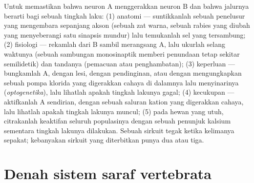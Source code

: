 \begin{method}\label{met:b3:nervous-systems:tracing}
Untuk memastikan bahwa neuron A menggerakkan neuron B dan bahwa jalurnya
berarti bagi sebuah tingkah laku: (1) anatomi --- suntikkanlah sebuah penelusur
yang mengembara sepanjang akson (sebuah zat warna, sebuah  rabies yang
diubah yang menyeberangi satu sinapsis mundur) lalu temukanlah sel yang
tersambung; (2) fisiologi --- rekamlah dari B sambil merangsang A, lalu ukurlah
selang waktunya (sebuah sambungan monosinaptik memberi penundaan tetap sekitar
semilidetik) dan tandanya (pemacuan atau penghambatan); (3) keperluan ---
bungkamlah A, dengan lesi, dengan pendinginan, atau dengan mengungkapkan sebuah
pompa klorida yang digerakkan cahaya di dalamnya lalu menyinarinya
(\emph{optogenetika}), lalu lihatlah apakah tingkah lakunya gagal; (4)
kecukupan --- aktifkanlah A sendirian, dengan sebuah saluran kation yang
digerakkan cahaya, lalu lihatlah apakah tingkah lakunya muncul; (5) pada hewan
yang utuh, citrakanlah keaktifan seluruh populasinya dengan sebuah penunjuk
kalsium sementara tingkah lakunya dilakukan. Sebuah sirkuit tegak ketika kelimanya
sepakat; kebanyakan sirkuit yang diterbitkan punya dua atau tiga.
\end{method}

\section{Denah sistem saraf vertebrata}

